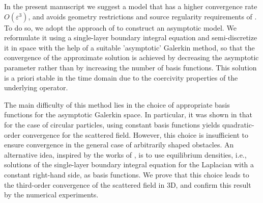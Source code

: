 \documentclass[]{article}
\numberwithin{equation}{section}
\numberwithin{theorem}{section}
\numberwithin{lemma}{section}
\numberwithin{corollary}{section}
\numberwithin{proposition}{section}
\numberwithin{definition}{section}
\newcommand{\re}{\varepsilon}
\begin{document}
	In the present manuscript we suggest a model that has a higher convergence rate $O(\re^3)$, and avoids geometry restrictions and source regularity requirements of \cite{sini_time_domain}. To do so, we adopt the approach of \cite{MK} to construct an asymptotic model. We reformulate it using a single-layer boundary integral equation and semi-discretize it in space with the help of a suitable 'asymptotic' Galerkin method, so that the convergence of the approximate solution is achieved by decreasing the asymptotic parameter rather than by increasing the number of basis functions.
	This solution is a priori stable in the time domain due to the coercivity properties of the underlying operator.
	
	The main difficulty of this method lies in the choice of appropriate basis functions for the asymptotic Galerkin space. In particular, it was shown in \cite{MK} that for the case of circular particles, using constant basis functions yields quadratic-order convergence for the scattered field. However, this choice is insufficient to ensure convergence in the general case of arbitrarily shaped obstacles.
	An alternative idea, inspired by the works of \cite{sini_frequency_domain, sini_time_domain}, is to use equilibrium densities, i.e., solutions of the single-layer boundary integral equation for the Laplacian with a constant right-hand side, as basis functions. We prove that this choice leads to the third-order convergence of the scattered field in 3D, and confirm this result by the numerical experiments.  
	
\end{document}
